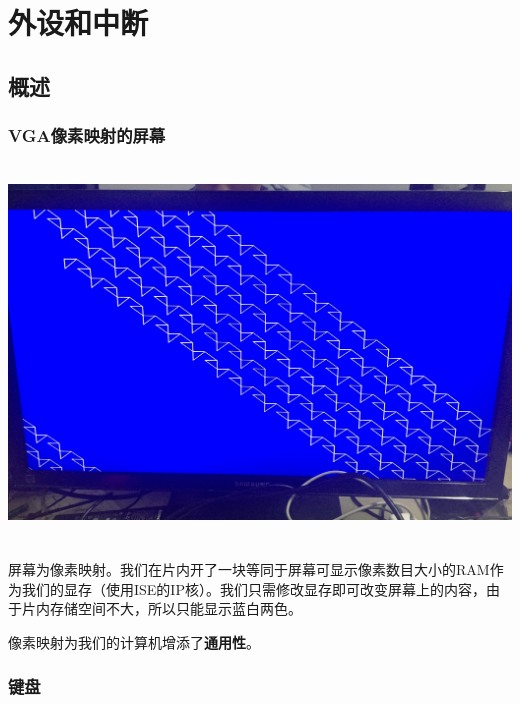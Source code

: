 \section{外设和中断}

\subsection{概述}

\subsubsection{VGA像素映射的屏幕}

\begin{center}
    \includegraphics[height=10cm]{image/extension/tri.JPG}
    \label{fig:tri}
\end{center}

屏幕为像素映射。我们在片内开了一块等同于屏幕可显示像素数目大小的RAM作为我们的显存（使用ISE的IP核）。我们只需修改显存即可改变屏幕上的内容，由于片内存储空间不大，所以只能显示蓝白两色。

像素映射为我们的计算机增添了\textbf{通用性}。

\subsubsection{键盘}

